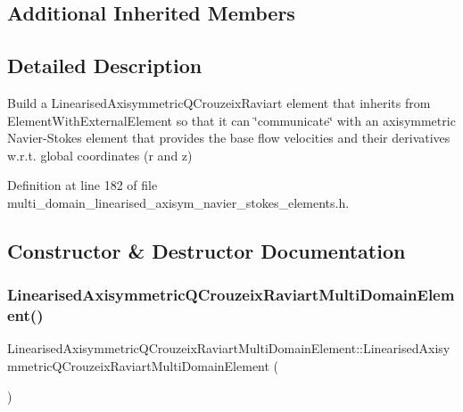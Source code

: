 \subsection*{Additional Inherited Members}


\subsection{Detailed Description}
Build a Linearised\+Axisymmetric\+Q\+Crouzeix\+Raviart element that inherits from Element\+With\+External\+Element so that it can \char`\"{}communicate\char`\"{} with an axisymmetric Navier-\/\+Stokes element that provides the base flow velocities and their derivatives w.\+r.\+t. global coordinates (r and z) 

Definition at line 182 of file multi\+\_\+domain\+\_\+linearised\+\_\+axisym\+\_\+navier\+\_\+stokes\+\_\+elements.\+h.



\subsection{Constructor \& Destructor Documentation}
\mbox{\label{classLinearisedAxisymmetricQCrouzeixRaviartMultiDomainElement_a44b98530424fd186461729f48aa0a9d5}} 
\subsubsection{\texorpdfstring{Linearised\+Axisymmetric\+Q\+Crouzeix\+Raviart\+Multi\+Domain\+Element()}{LinearisedAxisymmetricQCrouzeixRaviartMultiDomainElement()}}
{\footnotesize\ttfamily Linearised\+Axisymmetric\+Q\+Crouzeix\+Raviart\+Multi\+Domain\+Element\+::\+Linearised\+Axisymmetric\+Q\+Crouzeix\+Raviart\+Multi\+Domain\+Element (\begin{DoxyParamCaption}{ }\end{DoxyParamCaption})\hspace{0.3cm}{\ttfamily [inline]}}



